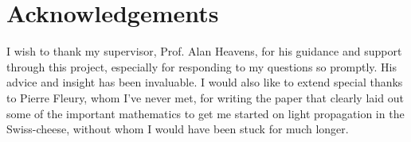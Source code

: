 \chapter*{\centering Acknowledgements}


I wish to thank my supervisor, Prof. Alan Heavens, for his guidance and support through this project, especially for responding to my questions so promptly. His advice and insight has been invaluable. I would also like to extend special thanks to Pierre Fleury, whom I've never met, for writing the paper that clearly laid out some of the important mathematics to get me started on light propagation in the Swiss-cheese, without whom I would have been stuck for much longer. 